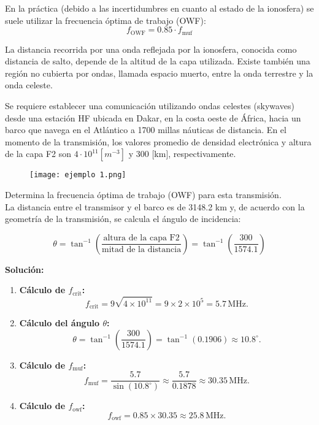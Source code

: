En la práctica (debido a las incertidumbres en cuanto al estado de la ionosfera) se suele utilizar la frecuencia óptima de trabajo (OWF):
\begin{equation}
f_\text{OWF} = 0.85 \cdot f_\text{muf} 
\end{equation}

La distancia recorrida por una onda reflejada por la ionosfera, conocida como distancia de salto, depende de la altitud de la capa utilizada. Existe también una región no cubierta por ondas, llamada espacio muerto, entre la onda terrestre y la onda celeste.\\


\begin{example}

Se requiere establecer una comunicación utilizando ondas celestes (skywaves) desde una estación HF ubicada en Dakar, en la costa oeste de África, hacia un barco que navega en el Atlántico a 1700 millas náuticas de distancia. En el momento de la transmisión, los valores promedio de densidad electrónica y altura de la capa F2 son \(4 \cdot {10}^{11} [m^{-3}]\) y 300 [km], respectivamente.\\

\begin{figure}[H]
    \centering
    \texttt{[image: ejemplo 1.png]}
\end{figure}

Determina la frecuencia óptima de trabajo (OWF) para esta transmisión.\\

La distancia entre el transmisor y el barco es de 3148.2 km y, de acuerdo con la geometría de la transmisión, se calcula el ángulo de incidencia:

\[
\theta = \tan^{-1}\left(\frac{\text{altura de la capa F2}}{\text{mitad de la distancia}} \right) = \tan^{-1}\left(\frac{300}{1574.1}\right)
\]

\textbf{Solución:}
\begin{enumerate}
    \item \textbf{Cálculo de \(f_\text{crit}\):}
    \[
    f_\text{crit} = 9 \sqrt{4 \times 10^{11}} = 9 \times 2 \times 10^5 = 5.7 \, \text{MHz}.
    \]

    \item \textbf{Cálculo del ángulo \(\theta\):}
    \[
    \theta = \tan^{-1}\left(\frac{300}{1574.1}\right) = \tan^{-1}(0.1906) \approx 10.8^\circ.
    \]

    \item \textbf{Cálculo de \(f_\text{muf}\):}
    \[
    f_\text{muf} = \frac{5.7}{\sin(10.8^\circ)} \approx \frac{5.7}{0.1878} \approx 30.35 \, \text{MHz}.
    \]

    \item \textbf{Cálculo de \(f_\text{owf}\):}
    \[
    f_\text{owf} = 0.85 \times 30.35 \approx 25.8 \, \text{MHz}.
    \]
\end{enumerate}
\end{example}


